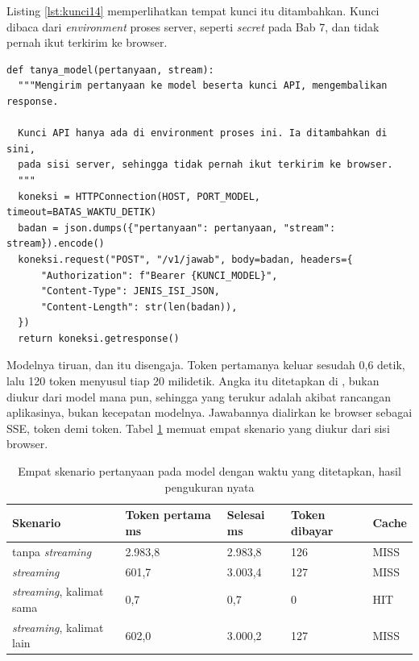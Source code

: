 Listing \ref{lst:kunci14} memperlihatkan tempat kunci itu ditambahkan. Kunci
dibaca dari \textit{environment} proses server, seperti \textit{secret} pada
Bab 7, dan tidak pernah ikut terkirim ke browser.

\begin{lstlisting}[style=PythonStyle, caption={Kunci API ditambahkan di sisi server, tersedia di \berkas{sources/chapter14/asisten.py}}, label={lst:kunci14}]
def tanya_model(pertanyaan, stream):
  """Mengirim pertanyaan ke model beserta kunci API, mengembalikan response.

  Kunci API hanya ada di environment proses ini. Ia ditambahkan di sini,
  pada sisi server, sehingga tidak pernah ikut terkirim ke browser.
  """
  koneksi = HTTPConnection(HOST, PORT_MODEL, timeout=BATAS_WAKTU_DETIK)
  badan = json.dumps({"pertanyaan": pertanyaan, "stream": stream}).encode()
  koneksi.request("POST", "/v1/jawab", body=badan, headers={
      "Authorization": f"Bearer {KUNCI_MODEL}",
      "Content-Type": JENIS_ISI_JSON,
      "Content-Length": str(len(badan)),
  })
  return koneksi.getresponse()
\end{lstlisting}

Modelnya tiruan, dan itu disengaja. Token pertamanya keluar sesudah 0,6
detik, lalu 120 token menyusul tiap 20 milidetik. Angka itu ditetapkan di
, bukan diukur dari model mana pun, sehingga yang
terukur adalah akibat rancangan aplikasinya, bukan kecepatan modelnya.
Jawabannya dialirkan ke browser sebagai SSE, token demi token. Tabel \ref{tab:llm14} memuat empat skenario yang diukur dari
sisi browser.

\begin{table}[!htb]
  \centering
  \caption{Empat skenario pertanyaan pada model dengan waktu yang ditetapkan,
           hasil pengukuran nyata}
  \label{tab:llm14}
  \begin{tabularx}{\textwidth}{Xllll}
    \hline
    \textbf{Skenario} & \textbf{Token pertama ms} & \textbf{Selesai ms} & \textbf{Token dibayar} & \textbf{Cache} \\
    \hline
    tanpa \textit{streaming} & 2.983,8 & 2.983,8 & 126 & MISS \\
    \hline
    \textit{streaming} & 601,7 & 3.003,4 & 127 & MISS \\
    \hline
    \textit{streaming}, kalimat sama & 0,7 & 0,7 & 0 & HIT \\
    \hline
    \textit{streaming}, kalimat lain & 602,0 & 3.000,2 & 127 & MISS \\
    \hline
  \end{tabularx}
\end{table}


